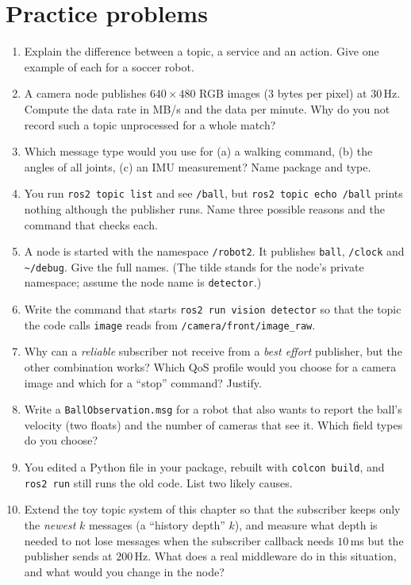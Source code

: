 \section*{Practice problems}
\begin{enumerate}[label=\textbf{\thechapter.\arabic*}]
  \item Explain the difference between a topic, a service and an action. Give one example of each for a soccer robot.
  \item A camera node publishes $640\times480$ RGB images (3 bytes per pixel) at $30$\,Hz. Compute the data rate in MB/s and the data per minute. Why do you not record such a topic unprocessed for a whole match?
  \item Which message type would you use for (a) a walking command, (b) the angles of all joints, (c) an IMU measurement? Name package and type.
  \item You run \verb!ros2 topic list! and see \verb!/ball!, but \verb!ros2 topic echo /ball! prints nothing although the publisher runs. Name three possible reasons and the command that checks each.
  \item A node is started with the namespace \verb!/robot2!. It publishes \verb!ball!, \verb!/clock! and \texttt{\textasciitilde/debug}. Give the full names. (The tilde stands for the node's private namespace; assume the node name is \verb!detector!.)
  \item Write the command that starts \verb!ros2 run vision detector! so that the topic the code calls \verb!image! reads from \verb!/camera/front/image_raw!.
  \item Why can a \emph{reliable} subscriber not receive from a \emph{best effort} publisher, but the other combination works? Which QoS profile would you choose for a camera image and which for a ``stop'' command? Justify.
  \item Write a \verb!BallObservation.msg! for a robot that also wants to report the ball's velocity (two floats) and the number of cameras that see it. Which field types do you choose?
  \item You edited a Python file in your package, rebuilt with \verb!colcon build!, and \verb!ros2 run! still runs the old code. List two likely causes.
  \item[\textbf{\thechapter.10}$\star$] Extend the toy topic system of this chapter so that the subscriber keeps only the \emph{newest} $k$ messages (a ``history depth'' $k$), and measure what depth is needed to not lose messages when the subscriber callback needs $10$\,ms but the publisher sends at $200$\,Hz. What does a real middleware do in this situation, and what would you change in the node?
\end{enumerate}
